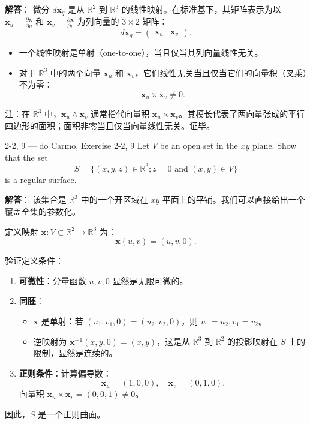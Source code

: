 \begin{solution}
\textbf{解答}：
微分 $d\mathbf{x}_q$ 是从 $\mathbb{R}^2$ 到 $\mathbb{R}^3$ 的线性映射。在标准基下，其矩阵表示为以 $\mathbf{x}_u = \frac{\partial \mathbf{x}}{\partial u}$ 和 $\mathbf{x}_v = \frac{\partial \mathbf{x}}{\partial v}$ 为列向量的 $3 \times 2$ 矩阵：
\[
d\mathbf{x}_q = \begin{pmatrix} \mathbf{x}_u & \mathbf{x}_v \end{pmatrix}.
\]

\begin{itemize}
    \item 一个线性映射是单射（one-to-one），当且仅当其列向量线性无关。
    \item 对于 $\mathbb{R}^3$ 中的两个向量 $\mathbf{x}_u$ 和 $\mathbf{x}_v$，它们线性无关当且仅当它们的向量积（叉乘）不为零：
    \[
    \mathbf{x}_u \times \mathbf{x}_v \neq 0.
    \]
\end{itemize}
注：在 $\mathbb{R}^3$ 中，$\mathbf{x}_u \wedge \mathbf{x}_v$ 通常指代向量积 $\mathbf{x}_u \times \mathbf{x}_v$。其模长代表了两向量张成的平行四边形的面积；面积非零当且仅当向量线性无关。证毕。
\end{solution}

\begin{exercise}{2-2, 9 — do Carmo, Exercise 2-2, 9}
Let $V$ be an open set in the $xy$ plane. Show that the set
\[
S = \{(x, y, z) \in \mathbb{R}^3; z = 0 \text{ and } (x, y) \in V\}
\]
is a regular surface.
\end{exercise}

\begin{solution}
\textbf{解答}：
该集合是 $\mathbb{R}^3$ 中的一个开区域在 $xy$ 平面上的平铺。我们可以直接给出一个覆盖全集的参数化。

定义映射 $\mathbf{x}: V \subset \mathbb{R}^2 \to \mathbb{R}^3$ 为：
\[
\mathbf{x}(u, v) = (u, v, 0).
\]

验证定义条件：
\begin{enumerate}
    \item \textbf{可微性}：分量函数 $u, v, 0$ 显然是无限可微的。
    \item \textbf{同胚}：
    \begin{itemize}
        \item $\mathbf{x}$ 是单射：若 $(u_1, v_1, 0) = (u_2, v_2, 0)$，则 $u_1 = u_2, v_1 = v_2$。
        \item 逆映射为 $\mathbf{x}^{-1}(x, y, 0) = (x, y)$，这是从 $\mathbb{R}^3$ 到 $\mathbb{R}^2$ 的投影映射在 $S$ 上的限制，显然是连续的。
    \end{itemize}
    \item \textbf{正则条件}：计算偏导数：
    \[
    \mathbf{x}_u = (1, 0, 0), \quad \mathbf{x}_v = (0, 1, 0).
    \]
    向量积 $\mathbf{x}_u \times \mathbf{x}_v = (0, 0, 1) \neq 0$。
\end{enumerate}
因此，$S$ 是一个正则曲面。
\end{solution}

